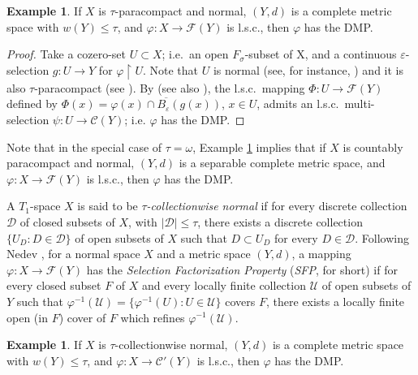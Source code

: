 \documentclass[12pt,a4paper,fleqn,leqno]{amsart}
\theoremstyle{plain}
\theoremstyle{definition}
\newtheorem{example}[theorem]{Example}
\numberwithin{equation}{section}
\begin{document}
\begin{example}
\label{example1}
If $X$ is $\tau$-paracompact and normal, $(Y,d)$ is a complete metric space with $w(Y)\leq\tau$, and $\varphi:X\to\mathscr{F}(Y)$ is l.s.c., then $\varphi$ has the DMP.
\end{example}

\begin{proof}
Take a cozero-set $U\subset X$; i.e.\ an open $F_{\sigma}$-subset of X, and a continuous $\varepsilon$-selection $g:U\to Y$ for $\varphi\operatorname{\upharpoonright} U$. Note that $U$ is normal (see, for instance, \cite[Problem 2.7.2 (b)]{Engelking}) and it is also $\tau$-paracompact (see \cite[Proposition 3]{michael3}). By \cite[Theorem 1.1]{michael5} (see also \cite[Theorem 11.2]{choban}), the l.s.c.\ mapping $\Phi:U\to\mathscr{F}(Y)$ defined by $\Phi(x)=\overline{\varphi(x)\cap B_{\varepsilon}(g(x))}$, $x\in U$, admits an l.s.c.\ multi-selection $\psi:U\to\mathscr{C}(Y)$; i.e. $\varphi$ has the DMP.
\end{proof}

Note that in the special case of $\tau=\omega$, Example \ref{example1} implies that if $X$ is countably paracompact and normal, $(Y,d)$ is a separable complete metric space, and $\varphi:X\to\mathscr{F}(Y)$ is l.s.c., then $\varphi$ has the DMP.\medskip

A $T_1$-space $X$ is said to be \emph{$\tau$-collectionwise normal} if for every discrete collection $\mathscr{D}$ of closed subsets of $X$, with $|\mathscr{D}|\leq\tau$, there exists a discrete collection $\big\{U_D: D\in \mathscr{D}\big\}$ of open subsets of $X$ such that $D\subset U_D$ for every $D\in \mathscr{D}$. Following Nedev \cite{nedev}, for a normal space $X$ and a metric space $(Y,d)$, a mapping $\varphi:X\to\mathscr{F}(Y)$ has the \emph{Selection Factorization Property} (\emph{SFP}, for short) if for every closed subset $F$ of $X$ and every locally finite collection $\mathscr{U}$ of open subsets of $Y$ such that $\varphi^{-1}(\mathscr{U})=\{\varphi^{-1}(U):U\in\mathscr{U}\}$ covers $F$, there exists a locally finite open (in $F$) cover of $F$ which refines $\varphi^{-1}(\mathscr{U})$.

\begin{example}
\label{cwn-exple}
If $X$ is $\tau$-collectionwise normal, $(Y,d)$ is a complete metric space with $w(Y)\leq\tau$, and $\varphi:X\to\mathscr{C}'(Y)$ is l.s.c., then $\varphi$ has the DMP.
\end{example}
\end{document}
